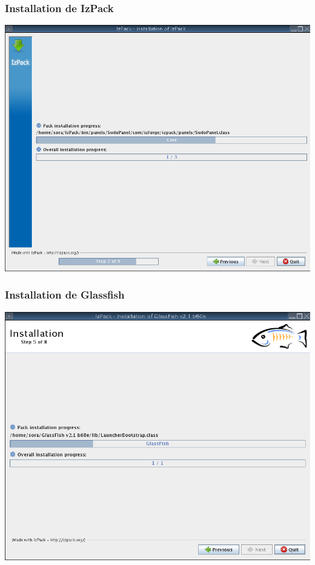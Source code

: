 \begin{frame}\frametitle{Installation de IzPack}
	\centering
	\includegraphics[width=\linewidth]{../image/installationIzpack.png}
\end{frame}
\begin{frame}\frametitle{Installation de Glassfish}
	\centering
	\includegraphics[width=\linewidth]{../image/installationGlassfish.png}
\end{frame}
